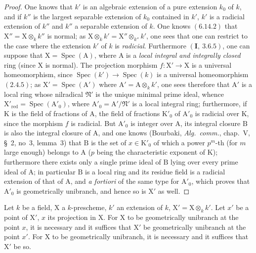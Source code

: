 \begin{proof}
One knows that $k'$ is an algebraic extension of a pure extension $k_0$ of $k$, and if $k''$
is the largest separable extension of $k_0$ contained in $k'$, $k'$ is a radicial extension
of $k''$ and $k''$ a separable extension of $k$. One knows $(6.14.2)$ that $\mathrm{X}''=\mathrm{X}\otimes_k k''$ is normal;
as $\mathrm{X}\otimes_k k'=\mathrm{X}''\otimes_{k''}k'$, one sees that one can restrict to the case where the extension $k'$ of $k$
is \emph{radicial}. Furthermore $(\mathbf{I},~3.6.5)$, one can suppose that $\mathrm{X}=\operatorname{Spec}(\mathrm{A})$, where $\mathrm{A}$ is a
\emph{local integral and integrally closed} ring (since $\mathrm{X}$ is normal). The projection morphism $f:\mathrm{X}'\to\mathrm{X}$
is a universal homeomorphism, since $\operatorname{Spec}(k')\to\operatorname{Spec}(k)$ is a universal homeomorphism
$(2.4.5)$; as $\mathrm{X}'=\operatorname{Spec}(\mathrm{A}')$ where $\mathrm{A}'=\mathrm{A}\otimes_k k'$, one sees therefore that $\mathrm{A}'$ is a
local ring whose nilradical $\mathfrak{N}'$ is the unique minimal prime ideal, whence $\mathrm{X}'_{\mathrm{red}}=\operatorname{Spec}(\mathrm{A}'_0)$,
where $\mathrm{A}'_0=\mathrm{A}'/\mathfrak{N}'$ is a local integral ring; furthermore, if $\mathrm{K}$ is the field of fractions of $\mathrm{A}$,
the field of fractions $\mathrm{K}'_0$ of $\mathrm{A}'_0$ is radicial over $\mathrm{K}$, since the morphism $f$ is radicial.
But $\mathrm{A}'_0$ is integer over $\mathrm{A}$, its integral closure $\mathrm{B}$ is also the integral closure of $\mathrm{A}$,
and one knows (Bourbaki, \emph{Alg.~comm.}, chap.~V,
\S~2, no~3, lemma~3) that $\mathrm{B}$ is the set of $x\in\mathrm{K}'_0$ of which a power $p^m$-th (for $m$
large enough) belongs to $\mathrm{A}$ ($p$ being the characteristic exponent of $\mathrm{K}$); furthermore there exists
only a single prime ideal of $\mathrm{B}$ lying over every prime ideal of $\mathrm{A}$; in particular $\mathrm{B}$
is a local ring and its residue field is a radicial extension of that of $\mathrm{A}$, and
\emph{a fortiori} of the same type for $\mathrm{A}'_0$, which proves that $\mathrm{A}'_0$ is geometrically unibranch, and hence
so is $\mathrm{X}'$ as well.
\end{proof}

\begin{proposition}[6.15.7]
\label{IV.6.15.7}
Let $k$ be a field, $\mathrm{X}$ a $k$-prescheme, $k'$ an extension of $k$,
$\mathrm{X}'=\mathrm{X}\otimes_k k'$. Let $x'$ be a point of $\mathrm{X}'$, $x$ its projection in $\mathrm{X}$. For $\mathrm{X}$ to be geometrically
unibranch at the point $x$, it is necessary and it suffices that $\mathrm{X}'$ be geometrically unibranch at the point $x'$. For
$\mathrm{X}$ to be geometrically unibranch, it is necessary and it suffices that $\mathrm{X}'$ be so.
\end{proposition}

